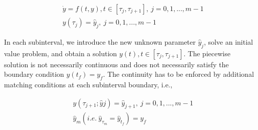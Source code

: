 \begin{equation}\label{eqn:msh}
	\begin{aligned}
		& \dot{y} = f(t, y) , t \in [\tau_j, \tau_{j+1}], \ j = 0, 1, ..., m-1  \\
		& y(\tau_j) = \hat{y}_j, \ j = 0, 1, ..., m-1 \
	\end{aligned}
\end{equation}

In each subinterval, we introduce the new unknown parameter $\hat{y}_j$, solve an initial value problem, and obtain a solution $y(t), t \in [\tau_j, \tau_{j+1}]$. The piecewise solution is not necessarily continuous and does not necessarily satisfy the boundary condition $y(t_f) = y_f$. The continuity has to be enforced by additional matching conditions at each subinterval boundary, i.e.,

\begin{equation}\label{eqn:mc}
	\begin{aligned}
		& y(\tau_{j+1}; \hat{y}j) = \hat{y}_{j+1}, \ j = 0, 1, ..., m-1  \\
		& \hat{y}_{m} (i.e. \ \hat{y}_{\tau_m} = \hat{y}_{t_f}) =  y_f 
	\end{aligned}
\end{equation}






